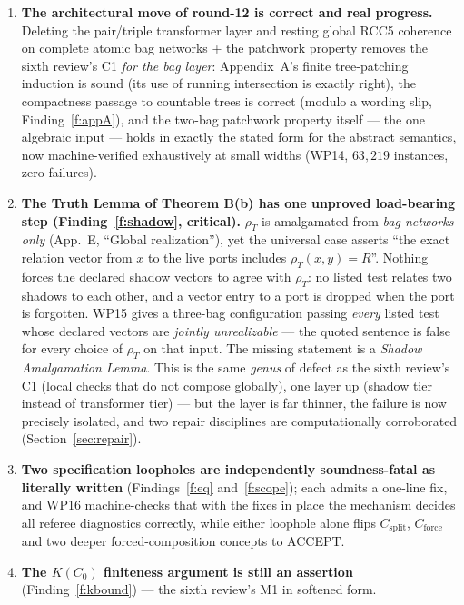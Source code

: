 \documentclass[11pt]{article}
\theoremstyle{definition}
\begin{document}
\begin{enumerate}[leftmargin=2em]
\item \textbf{The architectural move of round-12 is correct and real
progress.}  Deleting the pair/triple transformer layer and resting global
RCC5 coherence on complete atomic bag networks + the patchwork property
removes the sixth review's C1 \emph{for the bag layer}: Appendix~A's finite
tree-patching induction is sound (its use of running intersection is
exactly right), the compactness passage to countable trees is correct
(modulo a wording slip, Finding~\ref{f:appA}), and the two-bag patchwork
property itself --- the one algebraic input --- holds in exactly the stated
form for the abstract semantics, now machine-verified exhaustively at small
widths (WP14, $63{,}219$ instances, zero failures).

\item \textbf{The Truth Lemma of Theorem B(b) has one unproved load-bearing
step (Finding~\ref{f:shadow}, critical).}  $\rho_T$ is amalgamated from
\emph{bag networks only} (App.~E, ``Global realization''), yet the universal
case asserts ``the exact relation vector from $x$ to the live ports includes
$\rho_T(x,y)=R$''.  Nothing forces the declared shadow vectors to agree with
$\rho_T$: no listed test relates two shadows to each other, and a vector
entry to a port is dropped when the port is forgotten.  WP15 gives a
three-bag configuration passing \emph{every} listed test whose declared
vectors are \emph{jointly unrealizable} --- the quoted sentence is false for
every choice of $\rho_T$ on that input.  The missing statement is a
\emph{Shadow Amalgamation Lemma}.  This is the same \emph{genus} of defect
as the sixth review's C1 (local checks that do not compose globally), one
layer up (shadow tier instead of transformer tier) --- but the layer is far
thinner, the failure is now precisely isolated, and two repair disciplines
are computationally corroborated (Section~\ref{sec:repair}).

\item \textbf{Two specification loopholes are independently
soundness-fatal as literally written} (Findings~\ref{f:eq}
and~\ref{f:scope}); each admits a one-line fix, and WP16 machine-checks
that with the fixes in place the mechanism decides all referee diagnostics
correctly, while either loophole alone flips $C_{\mathrm{split}}$,
$C_{\mathrm{force}}$ and two deeper forced-composition concepts to ACCEPT.

\item \textbf{The $K(C_0)$ finiteness argument is still an assertion}
(Finding~\ref{f:kbound}) --- the sixth review's M1 in softened form.


\end{enumerate}
\end{document}
